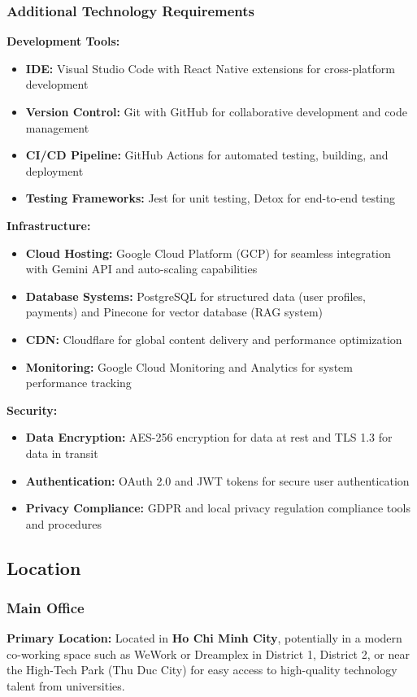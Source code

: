 \subsubsection{Additional Technology Requirements}
\textbf{Development Tools:}
\begin{itemize}
    \item \textbf{IDE:} Visual Studio Code with React Native extensions for cross-platform development
    \item \textbf{Version Control:} Git with GitHub for collaborative development and code management
    \item \textbf{CI/CD Pipeline:} GitHub Actions for automated testing, building, and deployment
    \item \textbf{Testing Frameworks:} Jest for unit testing, Detox for end-to-end testing
\end{itemize}

\textbf{Infrastructure:}
\begin{itemize}
    \item \textbf{Cloud Hosting:} Google Cloud Platform (GCP) for seamless integration with Gemini API and auto-scaling capabilities
    \item \textbf{Database Systems:} PostgreSQL for structured data (user profiles, payments) and Pinecone for vector database (RAG system)
    \item \textbf{CDN:} Cloudflare for global content delivery and performance optimization
    \item \textbf{Monitoring:} Google Cloud Monitoring and Analytics for system performance tracking
\end{itemize}

\textbf{Security:}
\begin{itemize}
    \item \textbf{Data Encryption:} AES-256 encryption for data at rest and TLS 1.3 for data in transit
    \item \textbf{Authentication:} OAuth 2.0 and JWT tokens for secure user authentication
    \item \textbf{Privacy Compliance:} GDPR and local privacy regulation compliance tools and procedures
\end{itemize}

\subsection{Location}

\subsubsection{Main Office}
\textbf{Primary Location:} Located in \textbf{Ho Chi Minh City}, potentially in a modern co-working space such as WeWork or Dreamplex in District 1, District 2, or near the High-Tech Park (Thu Duc City) for easy access to high-quality technology talent from universities.

